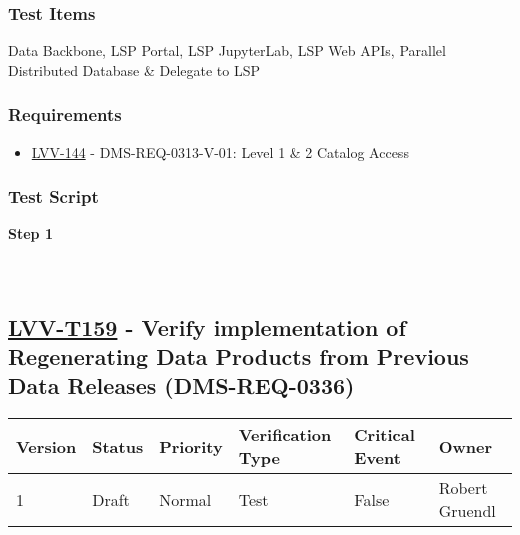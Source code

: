 \hypertarget{test-items-134}{%
\subsubsection{Test Items}\label{test-items-134}}

Data Backbone, LSP Portal, LSP JupyterLab, LSP Web APIs, Parallel
Distributed Database \& Delegate to LSP

\hypertarget{requirements-135}{%
\subsubsection{Requirements}\label{requirements-135}}

\begin{itemize}
\tightlist
\item
  \href{https://jira.lsstcorp.org/browse/LVV-144}{LVV-144} -
  DMS-REQ-0313-V-01: Level 1 \& 2 Catalog Access
\end{itemize}

\hypertarget{test-script-135}{%
\subsubsection{Test Script}\label{test-script-135}}

\textbf{Step 1}\\
~\\
~\\

\hypertarget{lvv-t159---verify-implementation-of-regenerating-data-products-from-previous-data-releases-dms-req-0336}{%
\subsection{\texorpdfstring{\href{https://jira.lsstcorp.org/secure/Tests.jspa\#/testCase/LVV-T159}{LVV-T159}
- Verify implementation of Regenerating Data Products from Previous Data
Releases
(DMS-REQ-0336)}{LVV-T159 - Verify implementation of Regenerating Data Products from Previous Data Releases (DMS-REQ-0336)}}\label{lvv-t159---verify-implementation-of-regenerating-data-products-from-previous-data-releases-dms-req-0336}}

\begin{longtable}[]{@{}llllll@{}}
\toprule
Version & Status & Priority & Verification Type & Critical Event &
Owner\tabularnewline
\midrule
\endhead
1 & Draft & Normal & Test & False & Robert Gruendl\tabularnewline
\bottomrule
\end{longtable}

